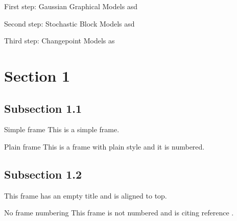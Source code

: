 \begin{frame}{First step: Gaussian Graphical Models}
    asd
\end{frame}

\begin{frame}{Second step: Stochastic Block Models}
    asd
\end{frame}

\begin{frame}{Third step: Changepoint Models}
    as
\end{frame}



    \section{Section 1}
    \subsection{Subsection 1.1}
    \begin{frame}{Simple frame}
        This is a simple frame.
    \end{frame}

    \begin{frame}[plain]{Plain frame}
        This is a frame with plain style and it is numbered.
    \end{frame}
    
    \subsection{Subsection 1.2}
    \begin{frame}[t]
        This frame has an empty title and is aligned to top.
    \end{frame}
    
    \begin{frame}[noframenumbering]{No frame numbering}
        This frame is not numbered and is citing reference \cite{knuth74}.
    \end{frame}
    
